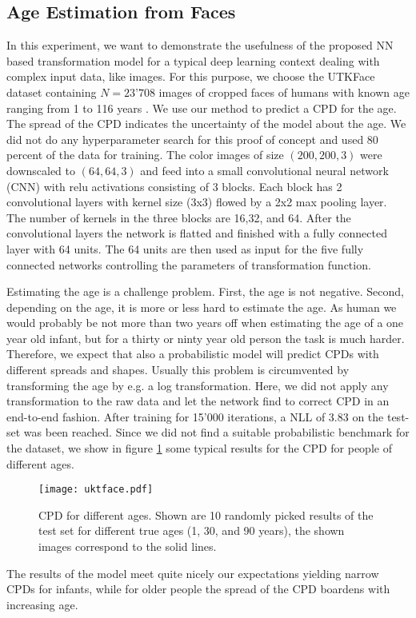 \documentclass[a4paper,conference]{IEEEtran}
\begin{document}
\subsection{Age Estimation from Faces}
In this experiment, we want to demonstrate the usefulness of the proposed NN based transformation model for a typical deep learning context dealing with complex input data, like images. For this purpose, we choose the UTKFace dataset containing $N=23’708$ images of cropped faces of humans with known age ranging from 1 to 116 years \cite{Zhang}. We use our method to predict a CPD for the age. The spread of the CPD indicates the uncertainty of the model about the age. We did not do any hyperparameter search for this proof of concept and used 80 percent of the data for training. The color images of size $(200, 200, 3)$ were downscaled to $(64,64, 3)$ and feed into a small convolutional neural network (CNN) with relu activations consisting of 3 blocks. Each block has 2 convolutional layers with kernel size (3x3) flowed by a 2x2 max pooling layer. The number of kernels in the three blocks are 16,32, and 64. After the convolutional layers the network is flatted and finished with a fully connected layer with 64 units. The 64 units are then used as input for the five fully connected networks controlling the parameters of transformation function. 

Estimating the age is a challenge problem. First, the age is not negative. Second, depending on the age, it is more or less hard to estimate the age. As human we would probably be not more than two years off when estimating the age of a one year old infant, but for a thirty or ninty year old person the task is much harder.  Therefore, we expect that also a probabilistic model will predict CPDs with different spreads and shapes. Usually this problem is circumvented by transforming the age by e.g. a log transformation. Here, we did not apply any transformation to the raw data and let the network find to correct CPD in an end-to-end fashion. After training for 15’000 iterations, a NLL of 3.83 on the test-set was been reached. Since we did not find a suitable probabilistic benchmark for the dataset, we show in figure \ref{fig:age} some typical results for the CPD for people of different ages.


\begin{figure}[h!]
\centering
\texttt{[image: uktface.pdf]}
\caption{CPD for different ages. Shown are 10 randomly picked results of the test set for different true ages (1, 30, and 90 years), the shown images correspond to the solid lines.}
\label{fig:age}
\end{figure}
The results of the model meet quite nicely our expectations yielding narrow CPDs for infants, while for older people the spread of the CPD boardens with increasing age.
\end{document}
